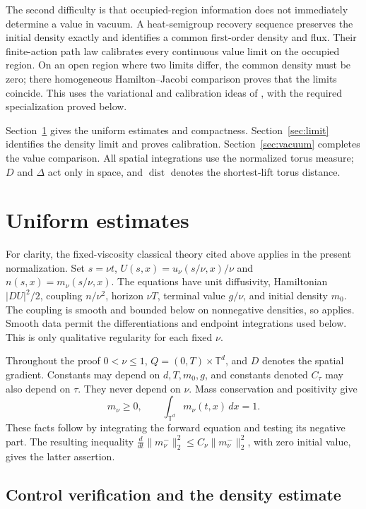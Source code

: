 \documentclass[11pt]{article}
\newcommand{\T}{\mathbb T}
\numberwithin{equation}{section}
\begin{document}
The second difficulty is that occupied-region information does not
immediately determine a value in vacuum. A heat-semigroup recovery
sequence preserves the initial density exactly and identifies a common
first-order density and flux. Their finite-action path law calibrates
every continuous value limit on the occupied region. On an open region
where two limits differ, the common density must be zero; there
homogeneous Hamilton--Jacobi comparison proves that the limits coincide.
This uses the variational and calibration ideas of
\cite{Cardaliaguet}, with the required specialization proved below.

Section~\ref{sec:estimates} gives the uniform estimates and compactness.
Section~\ref{sec:limit} identifies the density limit and proves
calibration. Section~\ref{sec:vacuum} completes the value comparison.
All spatial integrations use the normalized torus measure; \(D\) and
\(\Delta\) act only in space, and \(\operatorname{dist}\) denotes the
shortest-lift torus distance.
\section{Uniform estimates}\label{sec:estimates}


For clarity, the fixed-viscosity classical theory cited above applies in
the present normalization. Set \(s=\nu t\),
\(U(s,x)=u_\nu(s/\nu,x)/\nu\) and \(n(s,x)=m_\nu(s/\nu,x)\).
The equations have unit diffusivity, Hamiltonian \(|DU|^2/2\),
coupling \(n/\nu^2\), horizon \(\nu T\), terminal value \(g/\nu\),
and initial density \(m_0\). The coupling is smooth and bounded below
on nonnegative densities, so \cite[Theorem~4.1 and its regularity
conclusion]{CLLP} applies. Smooth data permit the differentiations and
endpoint integrations used below. This is only qualitative regularity
for each fixed \(\nu\).

Throughout the proof \(0<\nu\le1\), \(Q=(0,T)\times\T^d\), and \(D\)
denotes the spatial gradient. Constants may depend on \(d,T,m_0,g\), and
constants denoted \(C_\tau\) may also depend on \(\tau\). They never depend
on \(\nu\). Mass conservation and positivity give
\[
 m_\nu\ge0,\qquad \int_{\T^d}m_\nu(t,x)\,dx=1 .
\]
These facts follow by integrating the forward equation and testing its
negative part. The resulting inequality
\(\frac d{dt}\|m_\nu^-\|_2^2\le C_\nu\|m_\nu^-\|_2^2\), with zero
initial value, gives the latter assertion.

\subsection{Control verification and the density estimate}
\end{document}
